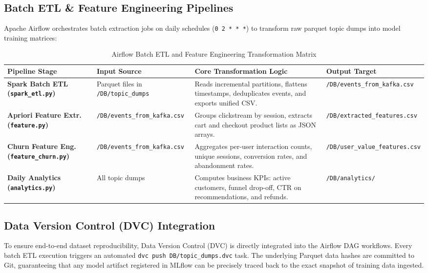 \documentclass[11pt,a4paper]{article}
\begin{document}
\subsection{Batch ETL \& Feature Engineering Pipelines}
Apache Airflow orchestrates batch extraction jobs on daily schedules (\texttt{0 2 * * *}) to transform raw parquet topic dumps into model training matrices:

\begin{table}[h]
\centering
\small
\begin{tabularx}{\textwidth}{@{}>{\bfseries}p{3.5cm}p{3.2cm}p{4.2cm}X@{}}
\toprule
\color{DeepNavy}Pipeline Stage & \color{DeepNavy}Input Source & \color{DeepNavy}Core Transformation Logic & \color{DeepNavy}Output Target \\
\midrule
Spark Batch ETL \newline (\texttt{spark\_etl.py}) & Parquet files in \newline \texttt{/DB/topic\_dumps} & Reads incremental partitions, flattens timestamps, deduplicates events, and exports unified CSV. & \texttt{/DB/events\_from\_kafka.csv} \\
\addlinespace
Apriori Feature Extr. \newline (\texttt{feature.py}) & \texttt{/DB/events\_from\_kafka.csv} & Groups clickstream by session, extracts cart and checkout product lists as JSON arrays. & \texttt{/DB/extracted\_features.csv} \\
\addlinespace
Churn Feature Eng. \newline (\texttt{feature\_churn.py}) & \texttt{/DB/events\_from\_kafka.csv} & Aggregates per-user interaction counts, unique sessions, conversion rates, and abandonment rates. & \texttt{/DB/user\_value\_features.csv} \\
\addlinespace
Daily Analytics \newline (\texttt{analytics.py}) & All topic dumps & Computes business KPIs: active customers, funnel drop-off, CTR on recommendations, and refunds. & \texttt{/DB/analytics/} \\
\bottomrule
\end{tabularx}
\caption{Airflow Batch ETL and Feature Engineering Transformation Matrix}
\end{table}

\subsection{Data Version Control (DVC) Integration}
To ensure end-to-end dataset reproducibility, Data Version Control (DVC) is directly integrated into the Airflow DAG workflows. Every batch ETL execution triggers an automated \texttt{dvc push DB/topic\_dumps.dvc} task. The underlying Parquet data hashes are committed to Git, guaranteeing that any model artifact registered in MLflow can be precisely traced back to the exact snapshot of training data ingested.
\end{document}
